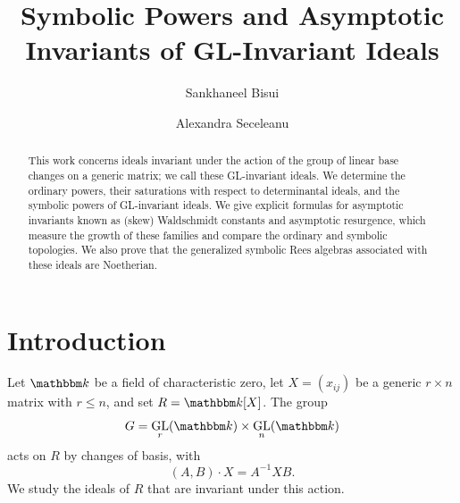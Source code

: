 \documentclass[11pt, reqno]{amsart}
\numberwithin{equation}{section}
\theoremstyle{definition}
\DeclareMathOperator{\GL}{GL}
\newcommand{\kk}{{\mathbbm k}}
\begin{document}
	\title{Symbolic Powers and Asymptotic Invariants of GL-Invariant Ideals}

	\author{Sankhaneel Bisui}
	\address{Department of Mathematics\\ Indian Institute of Science Education and Research Bhopal \\ Bhopal Bypass Road \\ Bhauri, Bhopal 462066 \\ Madhya Pradesh, India}

	\author{Alexandra Seceleanu}
	\address{ Department of Mathematics\\ University of Nebraska--Lincoln\\
		203 Avery Hall\\
		Lincoln, NE 68588, USA}


	\begin{abstract}
	This work concerns ideals invariant under the action of the group of linear base changes on a generic matrix; we call these GL-invariant ideals. We determine the ordinary powers, their saturations with respect to determinantal ideals, and the symbolic powers of GL-invariant ideals. We give explicit formulas for asymptotic invariants known as (skew) Waldschmidt constants and asymptotic resurgence, which measure the growth of these families and  compare  the ordinary and symbolic topologies. We also prove that the generalized symbolic Rees algebras associated with these ideals are Noetherian.\end{abstract}

	\maketitle

	\setcounter{tocdepth}{1}
	\tableofcontents

\section{Introduction}\label{s: intro}

Let $\kk$ be a field of characteristic zero, let
$X=(x_{ij})$ be a generic $r\times n$ matrix with $r\leq n$, and set
$R=\kk[X]$.  The group
\[
G=\GL_r(\kk)\times\GL_n(\kk)
\]
acts on $R$ by changes of basis, with
\[
(A,B)\cdot X=A^{-1}XB.
\]
We study the ideals of $R$ that are invariant under this action.
\end{document}
